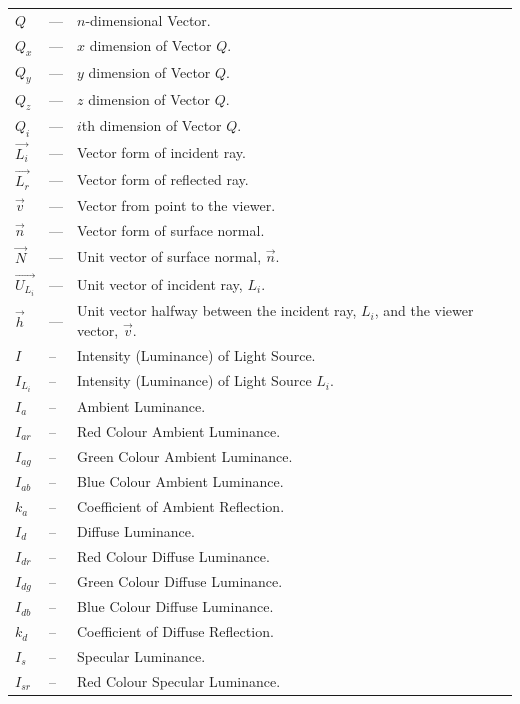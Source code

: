 \documentclass[12pt]{article}
\begin{document}
\begin{longtable*}{l l p{12cm}}
  \\
  $Q$ & --- & $n$-dimensional Vector.
  \\
  $Q_{x}$ & --- & $x$ dimension of Vector $Q$.
  \\
  $Q_{y}$ & --- & $y$ dimension of Vector $Q$.
  \\
  $Q_{z}$ & --- & $z$ dimension of Vector $Q$.
  \\
  $Q_{i}$ & --- & $i$th dimension of Vector $Q$.
  \\
  $\vec{L_{i}}$ & --- & Vector form of incident ray.
  \\
  $\vec{L_{r}}$ & --- & Vector form of reflected ray.
  \\
  $\vec{v}$ & --- & Vector from point to the viewer.
  \\
  $\vec{n}$ & --- & Vector form of surface normal.
  \\
  $\vec{N}$ & --- & Unit vector of surface normal, $\vec{n}$.
  \\
  $\vec{U_{L_{i}}}$ & --- & Unit vector of incident ray, $L_{i}$.
  \\
  $\vec{h}$ & --- & Unit vector halfway between the incident ray, $L_{i}$, and
  the viewer vector, $\vec{v}$.
  \\
  $I$ & -- & Intensity (Luminance) of Light Source. 
  \\
  $I_{L_{i}}$ & -- & Intensity (Luminance) of Light Source $L_{i}$.
  \\
  $I_{a}$ & -- & Ambient Luminance.
  \\
  $I_{ar}$ & -- & Red Colour Ambient Luminance.
  \\
  $I_{ag}$ & -- & Green Colour Ambient Luminance.
  \\
  $I_{ab}$ & -- & Blue Colour Ambient Luminance.
  \\
  $k_{a}$ & -- & Coefficient of Ambient Reflection.
  \\
  $I_{d}$ & -- & Diffuse Luminance.
  \\
  $I_{dr}$ & -- & Red Colour Diffuse Luminance.
  \\
  $I_{dg}$ & -- & Green Colour Diffuse Luminance.
  \\
  $I_{db}$ & -- & Blue Colour Diffuse Luminance.
  \\
  $k_{d}$ & -- & Coefficient of Diffuse Reflection.
  \\
  $I_{s}$ & -- & Specular Luminance.
  \\
  $I_{sr}$ & -- & Red Colour Specular Luminance.

\end{longtable*}
\end{document}
